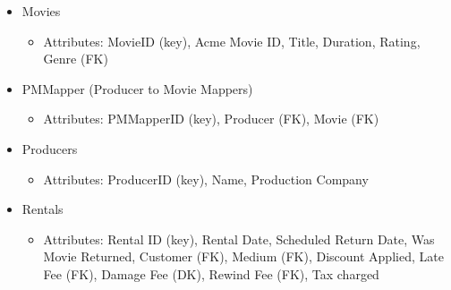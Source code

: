 \documentclass[letterpaper,12pt]{article}
\begin{document}
\begin{itemize}
\begin{itemize}
	      \end{itemize}
	\item Movies
	      \begin{itemize}
		      \item Attributes: MovieID (key), Acme Movie ID, Title, Duration, Rating, Genre (FK)
	      \end{itemize}
	\item PMMapper (Producer to Movie Mappers)
	      \begin{itemize}
		      \item Attributes: PMMapperID (key), Producer (FK), Movie (FK)
	      \end{itemize}
	\item Producers
	      \begin{itemize}
		      \item Attributes: ProducerID (key), Name, Production Company
	      \end{itemize}
	\item Rentals
	      \begin{itemize}
		      \item Attributes: Rental ID (key), Rental Date, Scheduled Return Date, Was Movie Returned, Customer (FK), Medium (FK), Discount Applied, Late Fee (FK), Damage Fee (DK), Rewind Fee (FK), Tax charged
	      \end{itemize}
\end{itemize}
\end{document}
